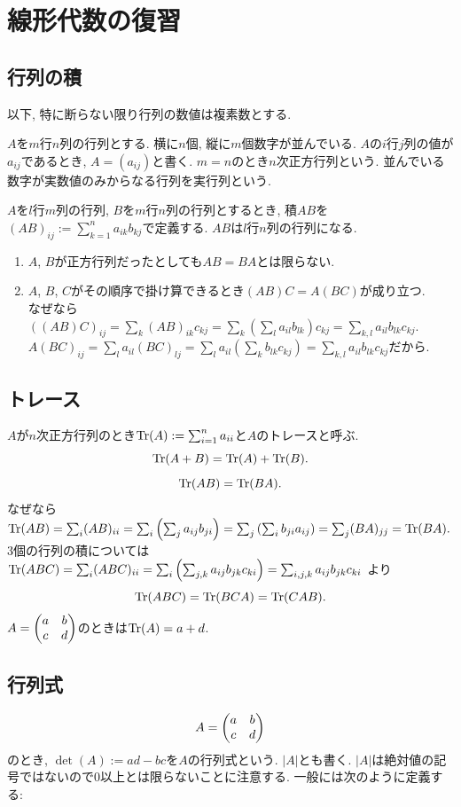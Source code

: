 \section{線形代数の復習}
\subsection{行列の積}
以下, 特に断らない限り行列の数値は複素数とする.

$A$を$m$行$n$列の行列とする. 横に$n$個, 縦に$m$個数字が並んでいる. $A$の$i$行$j$列の値が$a_{ij}$であるとき, $A=(a_{ij})$と書く. $m=n$のとき$n$次正方行列という. 並んでいる数字が実数値のみからなる行列を実行列という.

$A$を$l$行$m$列の行列, $B$を$m$行$n$列の行列とするとき, 積$AB$を$(AB)_{ij} := \sum_{k=1}^n a_{ik} b_{kj}$で定義する. $AB$は$l$行$n$列の行列になる.

\begin{enumerate}
\item $A$, $B$が正方行列だったとしても$AB=BA$とは限らない.
\item $A$, $B$, $C$がその順序で掛け算できるとき$(AB)C=A(BC)$が成り立つ.\\
なぜなら
$\left((AB)C\right)_{ij}=\sum_k (AB)_{ik} c_{kj} = \sum_k \left(\sum_l a_{il}b_{lk}\right) c_{kj} = \sum_{k,l} a_{il}b_{lk}c_{kj}$.\\
$A(BC)_{ij}=\sum_l a_{il} (BC)_{lj} = \sum_l a_{il} \left(\sum_k b_{lk}c_{kj}\right) = \sum_{k,l} a_{il}b_{lk}c_{kj}$だから.
\end{enumerate}
\vspace{0pt}

\subsection{トレース}

$A$が$n$次正方行列のとき$\mathop{\mathrm{Tr}}\nolimits(A) := \sum_{i=1}^n a_{ii}$と$A$のトレースと呼ぶ.
$$
\mathop{\mathrm{Tr}}\nolimits(A+B)=\mathop{\mathrm{Tr}}\nolimits(A) + \mathop{\mathrm{Tr}}\nolimits(B).
$$
$$
\mathop{\mathrm{Tr}}\nolimits(AB)=\mathop{\mathrm{Tr}}\nolimits(BA).
$$
なぜなら$\mathop{\mathrm{Tr}}\nolimits(AB)=\sum_i (AB)_{ii}=\sum_i \left(\sum_j a_{ij}b_{ji}\right)=\sum_j \left(\sum_i b_{ji}a_{ij}\right)=\sum_j (BA)_{jj}=\mathop{\mathrm{Tr}}\nolimits(BA).$
3個の行列の積については
$
\mathop{\mathrm{Tr}}\nolimits(ABC)=\sum_i (ABC)_{ii} = \sum_i \left(\sum_{j,k} a_{ij} b_{jk} c_{ki}\right) = \sum_{i,j,k} a_{ij} b_{jk} c_{ki}
$
より
$$
\mathop{\mathrm{Tr}}\nolimits(ABC)=\mathop{\mathrm{Tr}}\nolimits(BCA)=\mathop{\mathrm{Tr}}\nolimits(CAB).
$$
$\displaystyle A = \begin{pmatrix} a & b \\ c & d \end{pmatrix}$のときは$\mathop{\mathrm{Tr}}\nolimits(A)=a+d$.
\vspace{\baselineskip}

\subsection{行列式}
$$A = \begin{pmatrix} a & b \\ c & d \end{pmatrix}$$
のとき, $\det(A):=ad-bc$を$A$の行列式という. $|A|$とも書く.
$|A|$は絶対値の記号ではないので$0$以上とは限らないことに注意する.
一般には次のように定義する:


